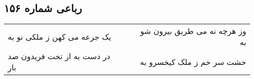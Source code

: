 \begin{center}
\section*{رباعی شماره ۱۵۶}
\label{sec:sh156}
\begin{longtable}{l p{0.5cm} r}
یک جرعه می کهن ز ملکی نو به
&&
وز هرچه نه می طریق بیرون شو به
\\
در دست به از تخت فریدون صد بار
&&
خشت سر خم ز ملک کیخسرو به
\\
\end{longtable}
\end{center}
